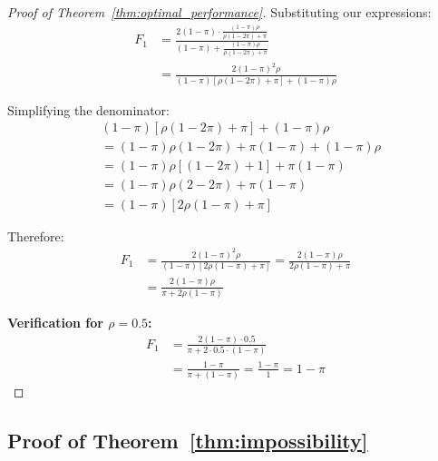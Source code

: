 \documentclass[fullpaper]{nldl}
\theoremstyle{plain}
\theoremstyle{definition}
\theoremstyle{remark}
\begin{document}
\begin{proof}[Proof of Theorem~\ref{thm:optimal_performance}]
Substituting our expressions:
\begin{align}
F_1 &= \frac{2(1-\pi) \cdot \frac{(1-\pi)\rho}{\rho(1-2\pi) + \pi}}{(1-\pi) + \frac{(1-\pi)\rho}{\rho(1-2\pi) + \pi}} \nonumber \\
&= \frac{2(1-\pi)^2\rho}{(1-\pi)[\rho(1-2\pi) + \pi] + (1-\pi)\rho}
\end{align}

Simplifying the denominator:
\begin{align}
&(1-\pi)[\rho(1-2\pi) + \pi] + (1-\pi)\rho \nonumber \\
&= (1-\pi)\rho(1-2\pi) + \pi(1-\pi) + (1-\pi)\rho \nonumber \\
&= (1-\pi)\rho[(1-2\pi) + 1] + \pi(1-\pi) \nonumber \\
&= (1-\pi)\rho(2-2\pi) + \pi(1-\pi) \nonumber \\
&= (1-\pi)[2\rho(1-\pi) + \pi]
\end{align}

Therefore:
\begin{align}
F_1 &= \frac{2(1-\pi)^2\rho}{(1-\pi)[2\rho(1-\pi) + \pi]} = \frac{2(1-\pi)\rho}{2\rho(1-\pi) + \pi} \nonumber \\
&= \frac{2(1-\pi)\rho}{\pi + 2\rho(1-\pi)}
\end{align}

\textbf{Verification for $\rho = 0.5$:}
\begin{equation}
\begin{aligned}
F_1 &= \frac{2(1-\pi) \cdot 0.5}{\pi + 2 \cdot 0.5 \cdot (1-\pi)} \\
&= \frac{1-\pi}{\pi + (1-\pi)} = \frac{1-\pi}{1} = 1 - \pi
\end{aligned}
\end{equation}

\end{proof}

\subsection{Proof of Theorem~\ref{thm:impossibility}}
\label{appendix:proof_impossibility}
\end{document}
